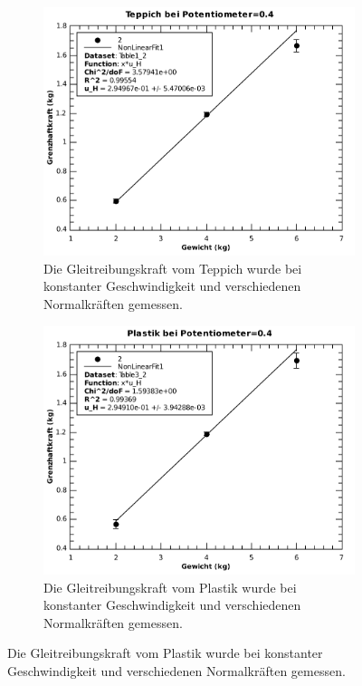 \begin{figure}[H]
    \centering
    \begin{subfigure}{.7\textwidth}
        \includegraphics[width=\linewidth]{images/teppich_haft_poti=0_4}
        \caption{Die Gleitreibungskraft vom Teppich wurde bei konstanter Geschwindigkeit und verschiedenen Normalkr\"aften gemessen.}
        \label{fig:teppich_haft_poti=0.4}
    \end{subfigure}
    \begin{subfigure}{.7\textwidth}
        \includegraphics[width=\linewidth]{images/plastik_haft_poti=0_4}
        \caption{Die Gleitreibungskraft vom Plastik wurde bei konstanter Geschwindigkeit und verschiedenen Normalkr\"aften gemessen.}
        \label{fig:plastik_haft_poti=0.4}
    \end{subfigure}
\end{figure}

